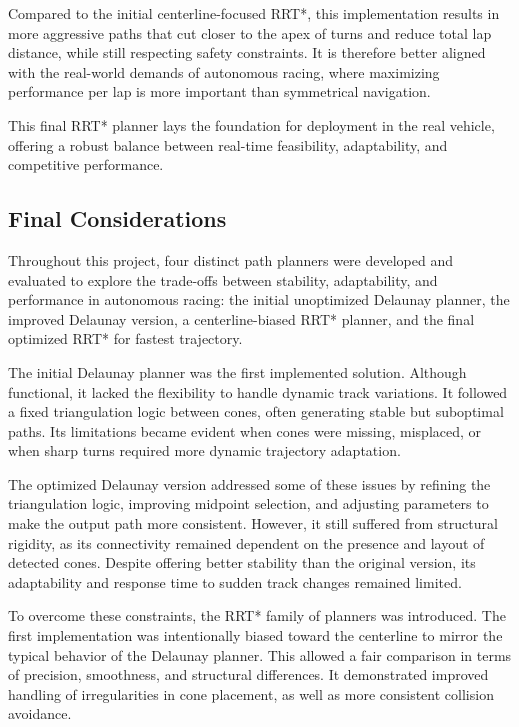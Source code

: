 \documentclass[a4paper,11pt]{report}
\begin{document}
Compared to the initial centerline-focused RRT*, this implementation results in more aggressive paths that cut closer to the apex of turns and reduce total lap distance, while still respecting safety constraints. It is therefore better aligned with the real-world demands of autonomous racing, where maximizing performance per lap is more important than symmetrical navigation.

This final RRT* planner lays the foundation for deployment in the real vehicle, offering a robust balance between real-time feasibility, adaptability, and competitive performance.

\subsection{Final Considerations}

Throughout this project, four distinct path planners were developed and evaluated to explore the trade-offs between stability, adaptability, and performance in autonomous racing: the initial unoptimized Delaunay planner, the improved Delaunay version, a centerline-biased RRT* planner, and the final optimized RRT* for fastest trajectory.

The initial Delaunay planner was the first implemented solution. Although functional, it lacked the flexibility to handle dynamic track variations. It followed a fixed triangulation logic between cones, often generating stable but suboptimal paths. Its limitations became evident when cones were missing, misplaced, or when sharp turns required more dynamic trajectory adaptation.

The optimized Delaunay version addressed some of these issues by refining the triangulation logic, improving midpoint selection, and adjusting parameters to make the output path more consistent. However, it still suffered from structural rigidity, as its connectivity remained dependent on the presence and layout of detected cones. Despite offering better stability than the original version, its adaptability and response time to sudden track changes remained limited.

To overcome these constraints, the RRT* family of planners was introduced. The first implementation was intentionally biased toward the centerline to mirror the typical behavior of the Delaunay planner. This allowed a fair comparison in terms of precision, smoothness, and structural differences. It demonstrated improved handling of irregularities in cone placement, as well as more consistent collision avoidance.
\end{document}
